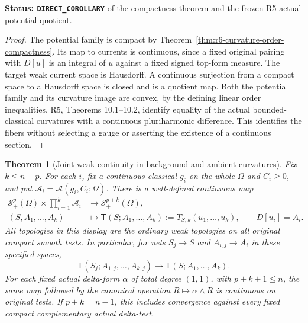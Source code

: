 \documentclass[11pt,a4paper]{article}
\numberwithin{equation}{section}
\newtheorem{theorem}{Theorem}[section]
\theoremstyle{definition}
\theoremstyle{remark}
\begin{document}
\noindent\textbf{Status: \texttt{DIRECT\_COROLLARY}} of the
compactness theorem and the frozen R5 actual potential quotient.

\begin{proof}
The potential family is compact by
Theorem~\ref{thm:r6-curvature-order-compactness}. Its map to currents
is continuous, since a fixed original pairing with $D[u]$ is an
integral of $u$ against a fixed signed top-form measure. The target
weak current space is Hausdorff. A continuous surjection from a compact
space to a Hausdorff space is closed and is a quotient map. Both the
potential family and its curvature image are convex, by the defining
linear order inequalities. R5, Theorems 10.1--10.2, identify equality
of the actual bounded-classical curvatures with a continuous
pluriharmonic difference. This identifies the fibers without selecting
a gauge or asserting the existence of a continuous section.
\end{proof}

\begin{theorem}[Joint weak continuity in background and ambient curvatures]
\label{thm:r6-curvature-interval-joint-topology}
Fix $k\leq n-p$. For each $i$, fix a continuous classical $g_i$ on
the whole $\Omega$ and $C_i\geq0$, and put
$\mathscr A_i=\mathscr A(g_i,C_i;\Omega)$. There is a well-defined
continuous map
\begin{equation}
 \begin{split}
 \mathscr S_+^p(\Omega)\times\prod_{i=1}^k\mathscr A_i
     &\longrightarrow\mathscr S_+^{p+k}(\Omega),\\
 (S,A_1,\ldots,A_k)&\longmapsto
             \mathsf T(S;A_1,\ldots,A_k)
              :=T_{S,k}(u_1,\ldots,u_k),\qquad D[u_i]=A_i.
 \end{split}
 \label{eq:r6-curvature-interval-joint-map}
\end{equation}
All topologies in this display are the ordinary weak topologies on
all original compact smooth tests. In particular, for nets
$S_j\to S$ and $A_{i,j}\to A_i$ in these specified spaces,
\[
       \mathsf T(S_j;A_{1,j},\ldots,A_{k,j})
              \longrightarrow\mathsf T(S;A_1,\ldots,A_k).
\]
For each fixed actual delta-form $\alpha$ of total degree $(1,1)$,
with $p+k+1\leq n$, the same map followed by the canonical operation
$R\mapsto\alpha\wedge R$ is continuous on original tests. If
$p+k=n-1$, this includes convergence against every fixed compact
complementary actual delta-test.
\end{theorem}
\end{document}
